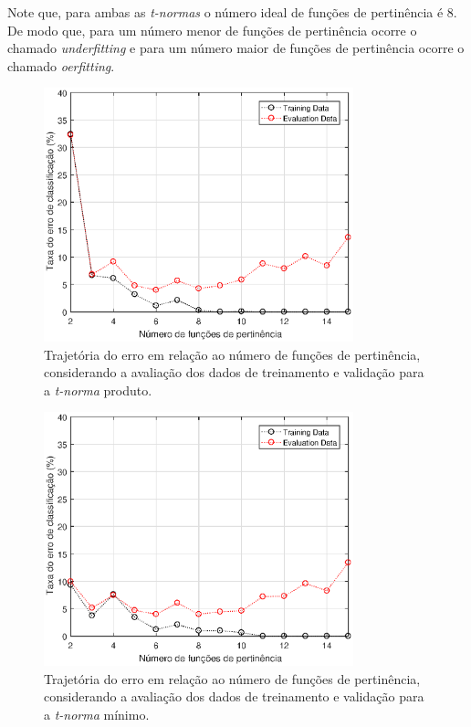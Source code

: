 \documentclass[12pt,a4paper]{article}
\numberwithin{equation}{section}
\begin{document}
Note que, para ambas as \textit{t-normas} o número ideal de funções de pertinência é $8$. De modo que, para um número menor de funções de pertinência ocorre o chamado \textit{underfitting} e para um número maior de funções de pertinência ocorre o chamado \textit{oerfitting}.


\begin{figure}[ht!]
\centering
\includegraphics[width=0.8\textwidth]{figures/error_product.eps}
\caption{Trajetória do erro em relação ao número de funções de pertinência, considerando a avaliação dos dados de treinamento e validação para a \textit{t-norma} produto.}
\label{fig:error_product}
\end{figure}

\begin{figure}[ht!]
\centering
\includegraphics[width=0.8\textwidth]{figures/error_minimum.eps}
\caption{Trajetória do erro em relação ao número de funções de pertinência, considerando a avaliação dos dados de treinamento e validação para a \textit{t-norma} mínimo.}
\label{fig:error_minimum}
\end{figure}
\end{document}
